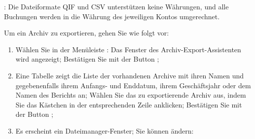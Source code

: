 \Attention{}: Die Dateiformate QIF und CSV unterstützen keine Währungen, und alle Buchungen werden in die Währung des jeweiligen Kontos umgerechnet.

Um ein Archiv zu exportieren, gehen Sie wie folgt vor:

\begin{enumerate}
	\item Wählen Sie in der Menüleiste : Das Fenster des Archiv-Export-Assistenten wird angezeigt; Bestätigen Sie mit der Button ;
	\item Eine Tabelle zeigt die Liste der vorhandenen Archive mit ihren Namen und gegebenenfalls ihrem Anfangs- und Enddatum, ihrem Geschäftsjahr oder dem Namen des Berichts an; Wählen Sie das zu exportierende Archiv aus, indem Sie das Kästchen in der entsprechenden Zeile anklicken; Bestätigen Sie mit der Button ;
	\item Es erscheint ein Dateimanager-Fenster; Sie können ändern:

\end{enumerate}
